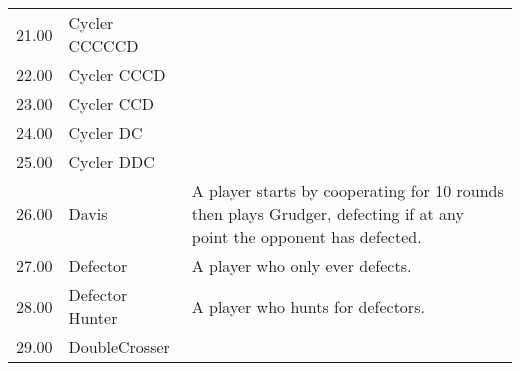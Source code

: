 \begin{table}[!hbtp]
\begin{adjustbox}{width=2\textwidth, angle=90}
\begin{tabular}{rll}
	21.00  & Cycler CCCCCD               &                                                                                                                                   \\
	22.00  & Cycler CCCD                 &                                                                                                                                   \\
	23.00  & Cycler CCD                  &                                                                                                                                   \\
	24.00  & Cycler DC                   &                                                                                                                                   \\
	25.00  & Cycler DDC                  &                                                                                                                                   \\
	26.00  & Davis                       & A player starts by cooperating for 10 rounds then plays Grudger,
	defecting if at any point the opponent has defected.                                                                                                                                                                                                                                                                                                                                                                                                                                                                                                                                                                                                                                                                                                                                                                                                                                                                                                \\
	27.00  & Defector                    & A player who only ever defects.                                                                                                   \\
	28.00  & Defector Hunter             & A player who hunts for defectors.                                                                                                 \\
	29.00  & DoubleCrosser               &                                                                                                                                   \\

\end{tabular}
\end{adjustbox}
\end{table}
